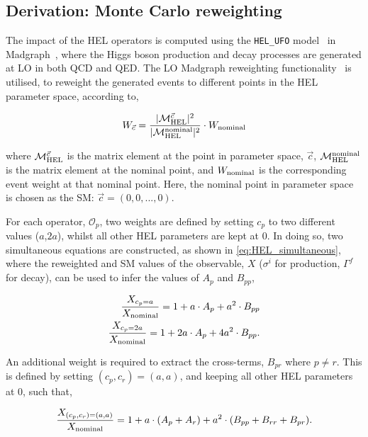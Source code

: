 \subsection{Derivation: Monte Carlo reweighting}\label{sec:hel_derivation}
The impact of the HEL operators is computed using the \texttt{HEL\_UFO} model~\cite{Alloul:2013naa} in Madgraph~\cite{Alwall:2014hca}, where the Higgs boson production and decay processes are generated at LO in both QCD and QED. The LO Madgraph reweighting functionality~\cite{Mattelaer:2016gcx} is utilised, to reweight the generated events to different points in the HEL parameter space, according to,

\begin{equation}
    W_{\vec{c}} = \frac{|\mathcal{M}^{\vec{c}}_{\rm{HEL}}|^2}{|\mathcal{M}^{\rm{nominal}}_{\rm{HEL}}|^2} \cdot W_{\rm{nominal}}
\end{equation}

\noindent
where $\mathcal{M}^{\vec{c}}_{\rm{HEL}}$ is the matrix element at the point in parameter space, $\vec{c}$, $\mathcal{M}^{\rm{nominal}}_{\rm{HEL}}$ is the matrix element at the nominal point, and $W_{\rm{nominal}}$ is the corresponding event weight at that nominal point. Here, the nominal point in parameter space is chosen as the SM: $\vec{c} = (0,0,...,0)$.

For each operator, $\mathcal{O}_p$, two weights are defined by setting $c_p$ to two different values ($a$,$2a$), whilst all other HEL parameters are kept at 0. In doing so, two simultaneous equations are constructed, as shown in \ref{eq:HEL_simultaneous}, where the reweighted and SM values of the observable, $X$ ($\sigma^i$ for production, $\Gamma^f$ for decay), can be used to infer the values of $A_p$ and $B_{pp}$,

\begin{equation}\label{eq:HEL_simultaneous}
    \begin{split}
        \frac{X_{c_p=a}}{X_{\rm{nominal}}} = 1 + a \cdot A_p + a^2 \cdot B_{pp} \\
        \frac{X_{c_p=2a}}{X_{\rm{nominal}}} = 1 + 2a \cdot A_p + 4a^2 \cdot B_{pp}.
    \end{split}
\end{equation}

\noindent
An additional weight is required to extract the cross-terms, $B_{pr}$ where $p \neq r$. This is defined by setting $(c_p,c_r)=(a,a)$, and keeping all other HEL parameters at 0, such that,

\begin{equation}
    \frac{X_{(c_p,c_r)=(a,a)}}{X_{\rm{nominal}}} = 1 + a \cdot (A_p+A_r) + a^2 \cdot (B_{pp}+B_{rr}+B_{pr}).
\end{equation}

